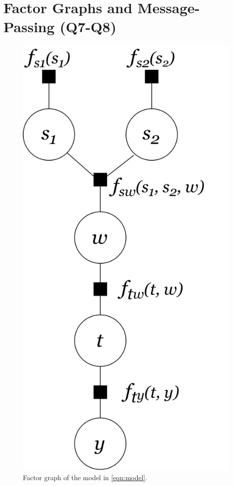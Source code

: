 \documentclass{article}
\begin{document}
	\section{Factor Graphs and Message-Passing (Q7-Q8)}
	\begin{figure} %
		\centering
		\includegraphics[width=\linewidth]{factor_graph}
		\caption{Factor graph of the model in \eqref{eqn:model}.}
		\label{fig:factor_graph}
	\end{figure}
	
\end{document}
